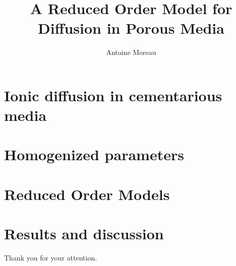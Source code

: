 \documentclass{beamer}
\title{A Reduced Order Model for Diffusion in Porous Media}
\author{Antoine Moreau}
\begin{document}

\maketitle


\section{Ionic diffusion in cementarious media}


\section{Homogenized parameters}












\section{Reduced Order Models}



\section{Results and discussion}







\begin{frame}%
\begin{center}
Thank you for your attention.
\end{center}
\end{frame}
\end{document}
